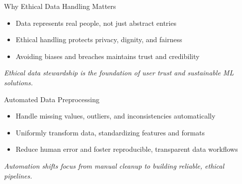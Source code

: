 \documentclass[aspectratio=169]{beamer}
\begin{document}
%
%
%
\begin{frame}{Why Ethical Data Handling Matters}
\begin{itemize}
\item Data represents real people, not just abstract entries
\item Ethical handling protects privacy, dignity, and fairness
\item Avoiding biases and breaches maintains trust and credibility
\end{itemize}

\vspace{0.8em}
\emph{Ethical data stewardship is the foundation of user trust and sustainable ML solutions.}

\end{frame}

%
%
\begin{frame}{Automated Data Preprocessing}
\begin{itemize}
\item Handle missing values, outliers, and inconsistencies automatically
\item Uniformly transform data, standardizing features and formats
\item Reduce human error and foster reproducible, transparent data workflows
\end{itemize}

\vspace{0.8em}
\emph{Automation shifts focus from manual cleanup to building reliable, ethical pipelines.}

\end{frame}
\end{document}
